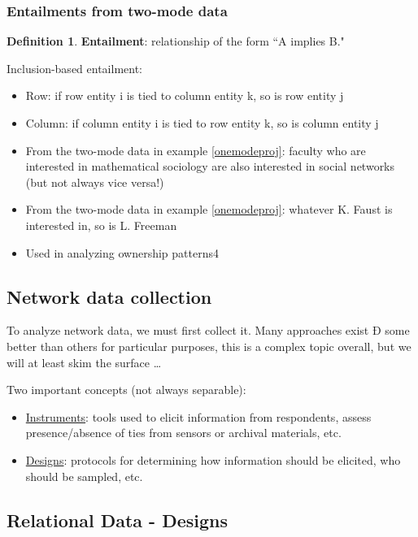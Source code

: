 \documentclass[]{book}
\theoremstyle{definition}
\newtheorem{definition}{Definition}[chapter]
\theoremstyle{definition}
\theoremstyle{definition}
\theoremstyle{remark}
\begin{document}
\subsubsection{Entailments from two-mode data}

\begin{definition} \label{entailment} 
\textbf{Entailment}: relationship of the form ``A implies B."

Inclusion-based entailment:
\begin{itemize}
\item Row: if row entity i is tied to column entity k, so is row entity j
\item Column: if column entity i is tied to row entity k, so is column entity j 
\item From the two-mode data in example \ref{onemodeproj}: faculty who are interested in mathematical sociology are also interested in social networks (but not always vice versa!) 
\item From the two-mode data in example \ref{onemodeproj}: whatever K. Faust is interested in, so is L. Freeman 
\item  Used in analyzing ownership patterns4 
\end{itemize}

\end{definition}

\subsection{Network data collection}

To analyze network data, we must first collect it. Many approaches exist
Ð some better than others for particular purposes, this is a complex
topic overall, but we will at least skim the surface \dots

Two important concepts (not always separable):

\begin{itemize}
\item \underline{Instruments}: tools used to elicit information from 
respondents, assess presence/absence of ties from 
sensors or archival materials, etc. 
\item \underline{Designs}: protocols for determining how information 
should be elicited, who should be sampled, etc.
\end{itemize}

\subsection{Relational Data - Designs}
\end{document}
